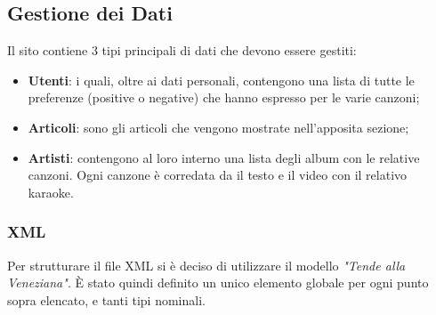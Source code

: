 \subsection{Gestione dei Dati}
Il sito contiene 3 tipi principali di dati che devono essere gestiti:
\begin{itemize}
    \item \textbf{Utenti}: i quali, oltre ai dati personali, contengono una lista di tutte le preferenze (positive o negative) che hanno espresso per le varie canzoni;
    \item \textbf{Articoli}: sono gli articoli che vengono mostrate nell'apposita sezione;
    \item \textbf{Artisti}: contengono al loro interno una lista degli album con le relative canzoni. Ogni canzone \`e corredata da il testo e il video con il relativo karaoke.
\end{itemize}

\subsubsection{XML}

Per strutturare il file XML si \`e deciso di utilizzare il modello \textit{"Tende alla Veneziana"}.  \`E stato quindi definito un unico elemento globale per ogni punto sopra elencato, e tanti tipi nominali.
